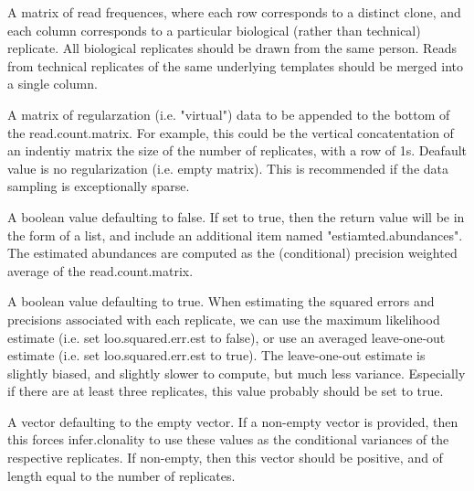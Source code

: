 \documentclass[letterpaper]{book}
\begin{document}
\begin{Arguments}
\begin{ldescription}
\item[\code{read.count.matrix}] 

A matrix of read frequences, where each row corresponds to a distinct clone, and each column corresponds to a particular biological (rather than technical) replicate. All biological replicates should be drawn from the same person. Reads from technical replicates of the same underlying templates should be merged into a single column.

\item[\code{regularization.clones}] 

A matrix of regularzation (i.e. "virtual") data to be appended to the bottom of the read.count.matrix. For example, this could be the vertical concatentation of an indentiy matrix the size of the number of replicates, with a row of 1s. Deafault value is no regularization (i.e. empty matrix). This is recommended if the data sampling is exceptionally sparse.

\item[\code{estimate.abundances}] 
A boolean value defaulting to false. If set to true, then the return value will be in the form of a list, and include an additional item named "estiamted.abundances". The estimated abundances are computed as the (conditional) precision weighted average of the read.count.matrix.

\item[\code{loo.squared.err.est}] 
A boolean value defaulting to true. When estimating the squared errors and precisions associated with each replicate, we can use the maximum likelihood estimate (i.e. set loo.squared.err.est to false), or use an averaged leave-one-out estimate (i.e. set loo.squared.err.est to true). The leave-one-out estimate is slightly biased, and slightly slower to compute, but much less variance. Especially if there are at least three replicates, this value probably should be set to true.

\item[\code{use.squared.err.est}] 
A vector defaulting to the empty vector. If a non-empty vector is provided, then this forces infer.clonality to use these values as the conditional variances of the respective replicates. If non-empty, then this vector should be positive, and of length equal to the number of replicates.

\end{ldescription}
\end{Arguments}
\end{document}

